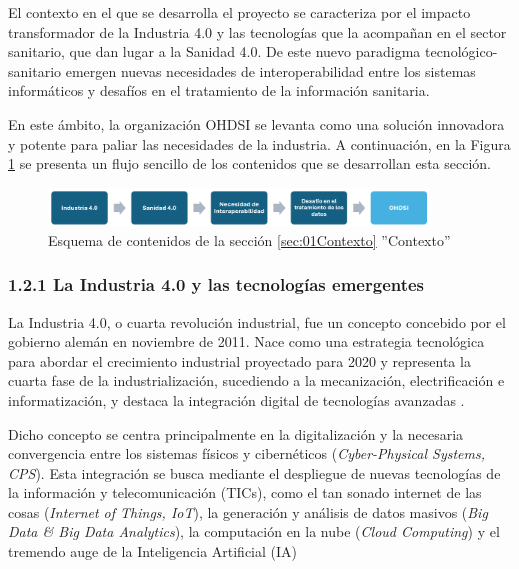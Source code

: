 El contexto en el que se desarrolla el proyecto se caracteriza por el impacto transformador de la Industria 4.0 y las tecnologías que la acompañan en el sector sanitario, que dan lugar a la Sanidad 4.0. De este nuevo paradigma tecnológico-sanitario emergen nuevas necesidades de interoperabilidad entre los sistemas informáticos y desafíos en el tratamiento de la información sanitaria.

En este ámbito, la organización OHDSI se levanta como una solución innovadora y potente para paliar las necesidades de la industria. A continuación, en la Figura \ref{fig:esquemaMarcoContextual} se presenta un flujo sencillo de los contenidos que se desarrollan esta sección.

\begin{figure}[H]
    \centering
    \includegraphics[width=0.90\textwidth]{figures/esquemaMarcoContextual.png}
    \caption{Esquema de contenidos de la sección \ref{sec:01Contexto} ''Contexto''}
    \label{fig:esquemaMarcoContextual}
\end{figure}


\subsubsection{1.2.1 La Industria 4.0 y las tecnologías emergentes}

La Industria 4.0, o cuarta revolución industrial, fue un concepto concebido por el gobierno alemán en noviembre de 2011. Nace como una estrategia tecnológica para abordar el crecimiento industrial proyectado para 2020 y representa la cuarta fase de la industrialización, sucediendo a la mecanización, electrificación e informatización, y destaca la integración digital de tecnologías avanzadas \cite{lasi2014industry}.

Dicho concepto se centra principalmente en la digitalización y la necesaria convergencia entre los sistemas físicos y cibernéticos (\textit{Cyber-Physical Systems, CPS}). Esta integración se busca mediante el despliegue  de nuevas tecnologías de la información y telecomunicación (TICs), como el tan sonado internet de las cosas (\textit{Internet of Things, IoT}), la generación y análisis de datos masivos (\textit{Big Data \& Big Data Analytics}), la computación en la nube (\textit{Cloud Computing}) y el tremendo auge de la Inteligencia Artificial (IA) \cite{lasi2014industry, chen2020times, tortorella2020healthcare}

